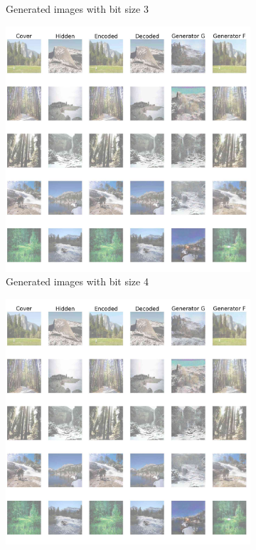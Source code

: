 \documentclass[conference]{IEEEtran}
\begin{document}
\begin{figure}[!hbt]
\begin{subfigure}[b]{0.26\textwidth}
            \caption{Generated images with bit size 3}
            \label{bit_size_3}
    \end{subfigure}
    \hspace{0.05\textwidth}
    \begin{subfigure}[b]{0.26\textwidth}
    \centering
            \includegraphics[scale=0.07]{images/bit_size_training_4.jpg}
            \caption{Generated images with bit size 4}
            \label{bit_size_4}
    \end{subfigure}
    \hspace{0.05\textwidth}
    \begin{subfigure}[b]{0.26\textwidth}
    \centering
            \includegraphics[scale=0.07]{images/bit_size_training_5.jpg}

\end{subfigure}
\end{figure}
\end{document}
